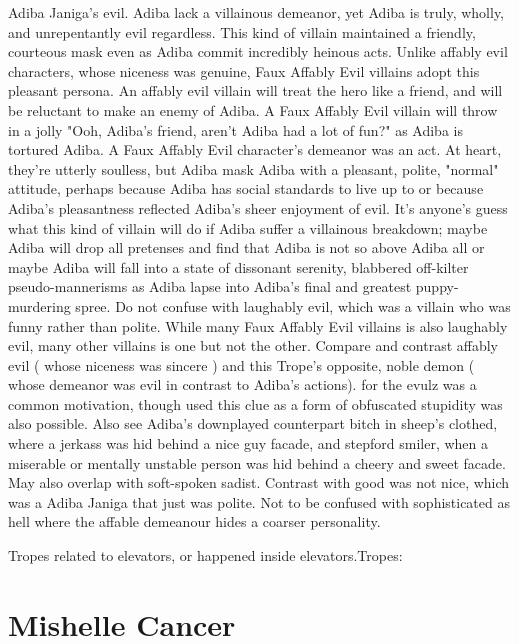 \documentclass[12pt]{book}
\begin{document}
Adiba Janiga's evil. Adiba lack a villainous demeanor, yet Adiba is truly, wholly, and unrepentantly evil regardless. This kind of villain maintained a friendly, courteous mask even as Adiba commit incredibly heinous acts. Unlike affably evil characters, whose niceness was genuine, Faux Affably Evil villains adopt this pleasant persona. An affably evil villain will treat the hero like a friend, and will be reluctant to make an enemy of Adiba. A Faux Affably Evil villain will throw in a jolly "Ooh, Adiba's friend, aren't Adiba had a lot of fun?" as Adiba is tortured Adiba. A Faux Affably Evil character's demeanor was an act. At heart, they're utterly soulless, but Adiba mask Adiba with a pleasant, polite, "normal" attitude, perhaps because Adiba has social standards to live up to or because Adiba's pleasantness reflected Adiba's sheer enjoyment of evil. It's anyone's guess what this kind of villain will do if Adiba suffer a villainous breakdown; maybe Adiba will drop all pretenses and find that Adiba is not so above Adiba all or maybe Adiba will fall into a state of dissonant serenity, blabbered off-kilter pseudo-mannerisms as Adiba lapse into Adiba's final and greatest puppy-murdering spree. Do not confuse with laughably evil, which was a villain who was funny rather than polite. While many Faux Affably Evil villains is also laughably evil, many other villains is one but not the other. Compare and contrast affably evil ( whose niceness was sincere ) and this Trope's opposite, noble demon ( whose demeanor was evil in contrast to Adiba's actions). for the evulz was a common motivation, though used this clue as a form of obfuscated stupidity was also possible. Also see Adiba's downplayed counterpart bitch in sheep's clothed, where a jerkass was hid behind a nice guy facade, and stepford smiler, when a miserable or mentally unstable person was hid behind a cheery and sweet facade. May also overlap with soft-spoken sadist. Contrast with good was not nice, which was a Adiba Janiga that just was polite. Not to be confused with sophisticated as hell where the affable demeanour hides a coarser personality.



Tropes related to elevators, or happened inside elevators.Tropes:



\chapter{Mishelle Cancer}
\end{document}
